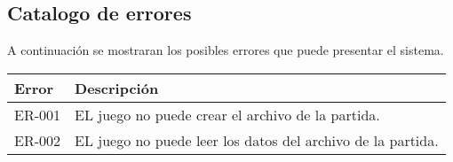 \subsection{Catalogo de errores}
A continuación se mostraran los posibles errores que puede presentar el sistema.
\begin{longtable}[c]{ | m{5cm} | m{10cm}|} 
		\hline
		\rowcolor{cyan}Error & Descripción \\ 
		\hline
		ER-001\label{ER:01} & EL juego no puede crear el archivo de la partida.\\ 
		\hline
		ER-002\label{ER:02} & EL juego no puede leer los datos del archivo de la partida.\\ 
		\hline
\end{longtable}
